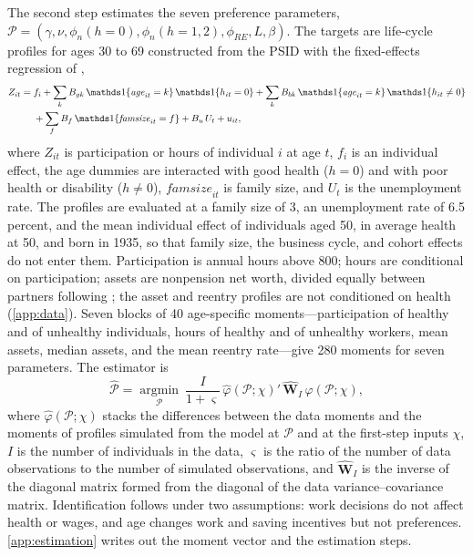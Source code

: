 The second step estimates the seven preference parameters, $\mathcal{P}=(\gamma,\nu,\allowbreak\phi_n(h{=}0),\allowbreak\phi_n(h{=}1,2),\allowbreak\phi_{RE},L,\beta)$. %
The targets are life-cycle profiles for ages 30 to 69 constructed from the PSID with the fixed-effects regression of \citet{french2005effects}, %
\begin{equation}\label{eq:profile}
\begin{split}
Z_{it}={}&f_i+\sum_{k}B_{gk}\,\ind{\mathit{age}_{it}=k}\,\ind{h_{it}=0}+\sum_{k}B_{bk}\,\ind{\mathit{age}_{it}=k}\,\ind{h_{it}\neq 0}\\
&+\sum_{f}B_{f}\,\ind{\mathit{famsize}_{it}=f}+B_{u}\,U_{t}+u_{it},
\end{split}
\end{equation}
where $Z_{it}$ is participation or hours of individual $i$ at age $t$, $f_i$ is an individual effect, the age dummies are interacted with good health ($h=0$) and with poor health or disability ($h\neq 0$), $\mathit{famsize}_{it}$ is family size, and $U_t$ is the unemployment rate. %
The profiles are evaluated at a family size of 3, an unemployment rate of 6.5 percent, and the mean individual effect of individuals aged 50, in average health at 50, and born in 1935, so that family size, the business cycle, and cohort effects do not enter them. %
Participation is annual hours above 800; hours are conditional on participation; assets are nonpension net worth, divided equally between partners following \citet{Borella2018}; the asset and reentry profiles are not conditioned on health (\autoref{app:data}). %
Seven blocks of 40 age-specific moments---participation of healthy and of unhealthy individuals, hours of healthy and of unhealthy workers, mean assets, median assets, and the mean reentry rate---give 280 moments for seven parameters. %
The estimator is
\begin{equation}\label{eq:msm}
\hat{\mathcal{P}}=\operatorname*{argmin}_{\mathcal{P}}\ \frac{I}{1+\varsigma}\,\hat{\varphi}(\mathcal{P};\chi)'\,\hat{\mathbf{W}}_{I}\,\hat{\varphi}(\mathcal{P};\chi),
\end{equation}
where $\hat{\varphi}(\mathcal{P};\chi)$ stacks the differences between the data moments and the moments of profiles simulated from the model at $\mathcal{P}$ and at the first-step inputs $\chi$, $I$ is the number of individuals in the data, $\varsigma$ is the ratio of the number of data observations to the number of simulated observations, and $\hat{\mathbf{W}}_{I}$ is the inverse of the diagonal matrix formed from the diagonal of the data variance--covariance matrix. %
Identification follows \citet{french2005effects} under two assumptions: work decisions do not affect health or wages, and age changes work and saving incentives but not preferences. %
\autoref{app:estimation} writes out the moment vector and the estimation steps.


